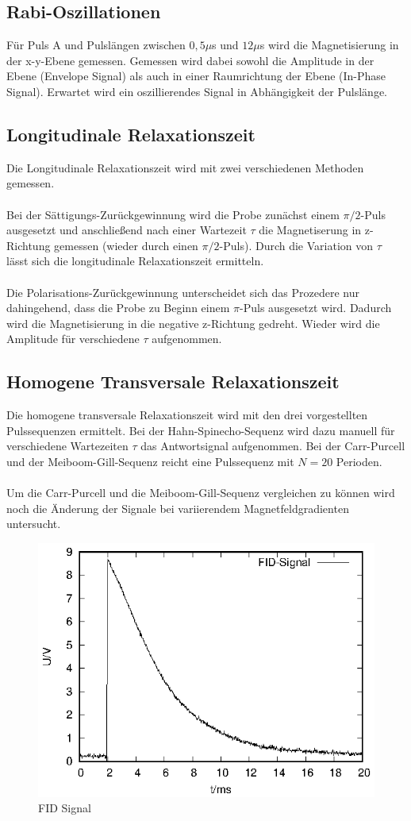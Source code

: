 \subsection{Rabi-Oszillationen}
Für Puls A und Pulslängen zwischen $0,5\mu$s und $12\mu$s wird die Magnetisierung in der x-y-Ebene gemessen. Gemessen wird dabei sowohl die Amplitude in der Ebene (Envelope Signal) als auch in einer Raumrichtung der Ebene (In-Phase Signal). Erwartet wird ein oszillierendes Signal in Abhängigkeit der Pulslänge. 

\subsection{Longitudinale Relaxationszeit}
Die Longitudinale Relaxationszeit wird mit zwei verschiedenen Methoden gemessen. \\ \\
Bei der Sättigungs-Zurückgewinnung wird die Probe zunächst einem $\pi/2$-Puls ausgesetzt und anschließend nach einer Wartezeit $\tau$ die Magnetiserung in z-Richtung gemessen (wieder durch einen $\pi/2$-Puls). Durch die Variation von $\tau$ lässt sich die longitudinale Relaxationszeit ermitteln. \\ \\
Die Polarisations-Zurückgewinnung unterscheidet sich das Prozedere nur dahingehend, dass die Probe zu Beginn einem $\pi$-Puls ausgesetzt wird. Dadurch wird die Magnetisierung in die negative z-Richtung gedreht. Wieder wird die Amplitude für verschiedene $\tau$ aufgenommen.

\subsection{Homogene Transversale Relaxationszeit}
Die homogene transversale Relaxationszeit wird mit den drei vorgestellten Pulssequenzen ermittelt. Bei der Hahn-Spinecho-Sequenz wird dazu manuell für verschiedene Wartezeiten $\tau$ das Antwortsignal aufgenommen. Bei der Carr-Purcell und der Meiboom-Gill-Sequenz reicht eine Pulssequenz mit $N=20$ Perioden.\\ \\
Um die Carr-Purcell und die Meiboom-Gill-Sequenz vergleichen zu können wird noch die Änderung der Signale bei variierendem Magnetfeldgradienten untersucht.

\begin{figure}[h]
  \centering
  \includegraphics[width=0.75\linewidth]{data/p402_443_data/FID_1/FID_1.eps}
  \caption{FID Signal}
  \label{fig:FID}
\end{figure}
